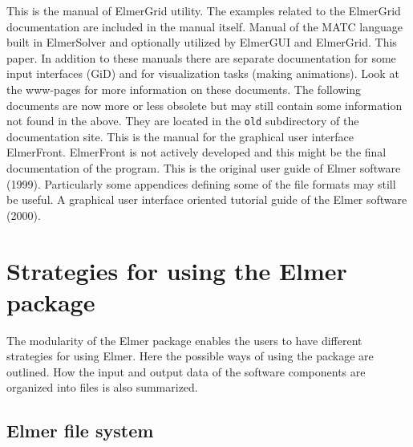 	This is the manual of ElmerGrid utility. The
	examples related to the ElmerGrid documentation are included in the manual itself.
	Manual of the MATC language built in ElmerSolver and optionally utilized by ElmerGUI and ElmerGrid.
	This paper.
\sifend
In addition to these manuals there are separate documentation for some input interfaces (GiD) and
for visualization tasks (making animations). Look at the www-pages for more information on these
documents. The following documents are now more or less obsolete but may still contain some 
information not found in the above. They are located in the \texttt{old} subdirectory of the
documentation site.
\sifbegin
{}
	This is the manual for the graphical user interface ElmerFront. ElmerFront is not actively developed 
	and this might be the final documentation of the program.
	This is the original user guide of Elmer software (1999). Particularly some appendices 
        defining some of the file formats may still be useful.
	A graphical user interface oriented tutorial guide of the Elmer software (2000). 
\sifend








\section{Strategies for using the Elmer package}

The modularity of the Elmer package enables the users to have different strategies 
for using Elmer. 
%
%
Here the possible ways of using
the package are outlined. How the input and output data of the software components
are organized into files is also summarized.



\subsection{Elmer file system}

